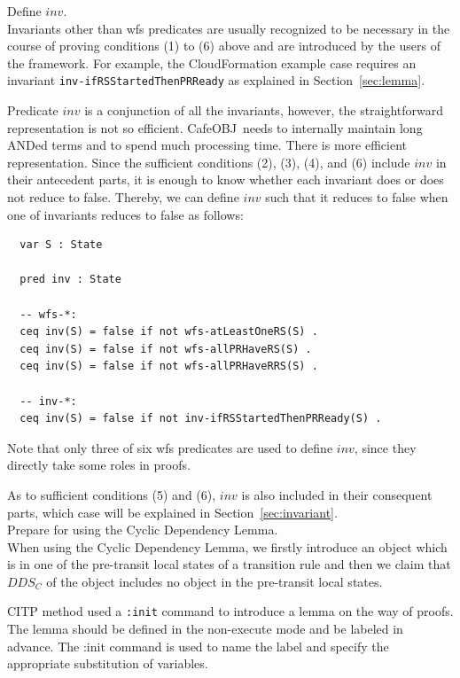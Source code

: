 \documentclass[12pt]{report}
\newcommand{\cafeobj}{{\sf CafeOBJ}~}
\begin{document}
 Define $inv$. \\ Invariants other than wfs
predicates are usually recognized to be necessary in the course of
proving conditions (1) to (6) above and are introduced by the users of
the framework. For example, the CloudFormation example case requires
an invariant {\tt inv-ifRSStartedThenPRReady} as explained in
Section~\ref{sec:lemma}.

Predicate $inv$ is a conjunction of all the invariants, however, the
straightforward representation is not so efficient. \cafeobj needs to
internally maintain long ANDed terms and to spend much processing
time. There is more efficient representation. Since the sufficient
conditions (2), (3), (4), and (6) include $inv$ in their antecedent
parts, it is enough to know whether each invariant does or does not
reduce to false. Thereby, we can define $inv$ such that it reduces to
false when one of invariants reduces to false as follows:
\small
\begin{verbatim}
  var S : State

  pred inv : State

  -- wfs-*:
  ceq inv(S) = false if not wfs-atLeastOneRS(S) .
  ceq inv(S) = false if not wfs-allPRHaveRS(S) .
  ceq inv(S) = false if not wfs-allPRHaveRRS(S) .

  -- inv-*:
  ceq inv(S) = false if not inv-ifRSStartedThenPRReady(S) .
\end{verbatim}
\normalsize
Note that only three of six wfs predicates are used to define $inv$,
since they directly take some roles in proofs.

As to sufficient conditions (5) and (6), $inv$ is also included in
their consequent parts, which case will be explained in
Section~\ref{sec:invariant}.\\

 Prepare for using the Cyclic Dependency
Lemma. \\ When using the Cyclic Dependency Lemma, we firstly introduce
an object which is in one of the pre-transit local states of a
transition rule and then we claim that $DDS_C$ of the object includes
no object in the pre-transit local states.

CITP method used a {\tt :init} command to introduce a lemma on the way
of proofs.  The lemma should be defined in the non-execute mode and be
labeled in advance. The :init command is used to name the label and
specify the appropriate substitution of variables.
\end{document}
